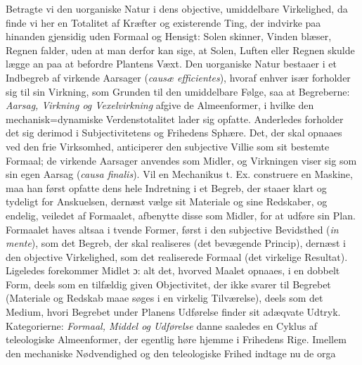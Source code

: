\documentclass[12pt]{book}
\newcommand{\dsi}{\textup{ɔ:}}
\newcommand{\opage}[1]{\marginnote{\footnotesize\textit{[#1]}}}
\begin{document}
Betragte vi den uorganiske Natur i dens objective, umiddelbare Virkelighed, da finde vi her
en Totalitet af Kræfter og existerende Ting, der indvirke paa hinanden gjensidig uden
Formaal og Hensigt: Solen skinner, Vinden blæser,
\opage{227} Regnen falder, uden at man derfor kan sige, at Solen, Luften eller Regnen skulde lægge an
paa at befordre Plantens Væxt. Den uorganiske Natur bestaaer i et Indbegreb af virkende
Aarsager (\textit{causæ efficientes}), hvoraf enhver især forholder sig til sin Virkning, som
Grunden til den umiddelbare Følge, saa at Begreberne: \emph{Aarsag, Virkning og
Vexelvirkning} afgive de Almeenformer, i hvilke den mechanisk=dynamiske Verdenstotalitet
lader sig opfatte.
Anderledes forholder det sig derimod i Subjectivitetens og Frihedens Sphære. Det, der skal
opnaaes ved den frie Virksomhed, anticiperer den subjective Villie som sit bestemte Formaal;
de virkende Aarsager anvendes som Midler, og Virkningen viser sig som sin egen Aarsag
(\textit{causa finalis}). Vil en Mechanikus t. Ex. construere en Maskine, maa han først
opfatte dens hele Indretning i et Begreb, der staaer klart og tydeligt for Anskuelsen,
dernæst vælge sit Materiale og sine Redskaber, og endelig, veiledet af Formaalet, afbenytte
disse som Midler, for at udføre sin Plan. Formaalet haves altsaa i tvende Former, først i
den subjective Bevidsthed (\textit{in mente}), som det Begreb, der skal realiseres (det
bevægende Princip), dernæst i den objective Virkelighed, som det realiserede Formaal (det
virkelige Resultat). Ligeledes forekommer Midlet \dsi{} alt det, hvorved Maalet opnaaes, i
en dobbelt Form, deels som en tilfældig given Objectivitet, der ikke svarer til Begrebet
(Materiale og Redskab maae søges i en virkelig Tilværelse), deels som det Medium, hvori
Begrebet under Planens Udførelse finder sit adæqvate Udtryk. Kategorierne: \emph{Formaal,
Middel og Udførelse} danne saaledes en Cyklus af teleologiske Almeenformer, der egentlig
høre hjemme i Frihedens Rige. Imellem den mechaniske Nødvendighed og den teleologiske Frihed
indtage nu de orga
\end{document}
